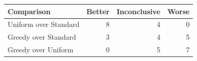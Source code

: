 \begin{tabular}{@{}lrrr@{}}
\toprule
Comparison & Better & Inconclusive & Worse \\
\midrule
Uniform over Standard & 8 & 4 & 0 \\
Greedy over Standard & 3 & 4 & 5 \\
Greedy over Uniform & 0 & 5 & 7 \\
\bottomrule
\end{tabular}
